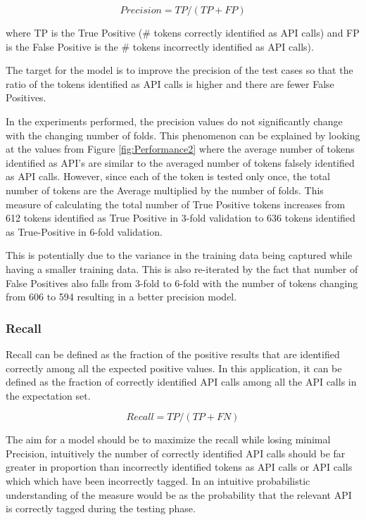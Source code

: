 \documentclass{sig-alternate-05-2015}
\begin{document}
\begin{equation}
Precision = TP/(TP+FP)
\end{equation}

where TP is the True Positive (\# tokens correctly identified as API calls) and FP is the False Positive is the \# tokens incorrectly identified as API calls).

The target for the model is to improve the precision of the test cases so that the ratio of the tokens identified as API calls is higher and there are fewer False Positives.

In the experiments performed, the precision values do not significantly change with the changing number of folds. This phenomenon can be explained by looking at the values from Figure \ref{fig:Performance2} where the average number of tokens identified as API's are similar to the averaged number of tokens falsely identified as API calls. However, since each of the token is tested only once, the total number of tokens are the Average multiplied by the number of folds. This measure of calculating the total number of True Positive tokens increases from 612 tokens identified as True Positive in 3-fold validation to 636 tokens identified as True-Positive in 6-fold validation. 

This is potentially due to the variance in the training data being captured while having a smaller training data. This is also re-iterated by the fact that number of False Positives also falls from 3-fold to 6-fold with the number of tokens changing from 606 to 594 resulting in a better precision model.

\subsubsection{Recall}
Recall can be defined as the fraction of the positive results that are identified correctly among all the expected positive values. In this application, it can be defined as the fraction of correctly identified API calls among all the API calls in the expectation set.

\begin{equation}
Recall = TP/(TP+FN)
\end{equation}

The aim for a model should be to maximize the recall while losing minimal Precision, intuitively the number of correctly identified API calls should be far greater in proportion than incorrectly identified tokens as API calls or API calls which which have been incorrectly tagged. In an intuitive probabilistic understanding of the measure would be as the probability that the relevant API is correctly tagged during the testing phase.
\end{document}
